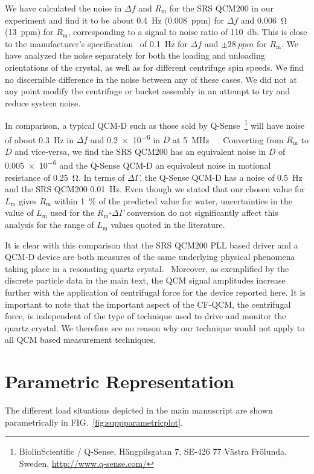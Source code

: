 \documentclass[floatfix,superscriptaddress,a4paper,notitlepage]{revtex4-1}
\newcommand{\Figure}[1]{FIG.~\ref{#1}}
\newcommand{\df}{\Delta\!f}
\newcommand{\dg}{\Delta\Gamma}
\newcommand{\Rm}{R_\mathrm{m}}
\newcommand{\Lm}{L_\mathrm{m}}
\begin{document}
We have calculated the noise in $\df$ and $\Rm$ for the SRS QCM200 in our
experiment and find it to be about \SI{0.4}{\hertz} (\SI{0.008}{ppm}) for
$\df$ and \SI{0.006}{\ohm} (\SI{13}{ppm}) for $\Rm$, corresponding to a
signal to noise ratio of \SI{110}{\decibel}.  This is close to the
manufacturer's specification~\cite{srsqcm200manual} of \SI{0.1}{\hertz} for
$\df$ and $\pm\SI{28}{ppm}$ for $\Rm$.  We have analyzed the noise
separately for both the loading and unloading orientations of the crystal,
as well as for different centrifuge spin speeds.  We find no discernible
difference in the noise between any of these cases.  We did not at any
point modify the centrifuge or bucket assembly in an attempt to try and
reduce system noise.

In comparison, a typical QCM-D such as those sold by
Q-Sense~\footnote{BiolinScientific / Q-Sense, Hängpilsgatan 7, SE-426 77
Västra Frölunda, Sweden,  \url{http://www.q-sense.com/}} will have noise of
about \SI{0.3}{\hertz} in $\df$ and \num{0.2e-6} in $D$ at
\SI{5}{\mega\hertz}~\cite{su2005comparison}~\cite{peh2007understanding}.
Converting from $\Rm$ to $D$ and vice-versa, we find the SRS QCM200 has an
equivalent noise in $D$ of \num{0.005e-6} and the Q-Sense QCM-D an
equivalent noise in motional resistance of \SI{0.25}{\ohm}.  In terms of
$\dg$, the Q-Sense QCM-D has a noise of \SI{0.5}{\hertz} and the SRS QCM200
\SI{0.01}{\hertz}.  Even though we stated that our chosen value for $\Lm$
gives $\Rm$ within \SI{1}{\percent} of the predicted value for water,
uncertainties in the value of $\Lm$ used for the $\Rm$-$\dg$ conversion do
not significantly affect this analysis for the range of $\Lm$ values quoted
in the literature.

It is clear with this comparison that the SRS QCM200 PLL based driver and a
QCM-D device are both measures of the same underlying physical phenomena
taking place in a resonating quartz crystal.~\cite{geelhood2002transient}
Moreover, as exemplified by the discrete particle data in the main text,
the QCM signal amplitudes increase further with the application of
centrifugal force for the device reported here.  It is important to note
that the important aspect of the CF-QCM, the centrifugal force, is
independent of the type of technique used to drive and monitor the quartz
crystal.  We therefore see no reason why our technique would not apply to
all QCM based measurement techniques.  

\section{Parametric Representation}
The different load situations depicted in the main manuscript are shown
parametrically in \Figure{fig:suppparametricplot}.
\end{document}

